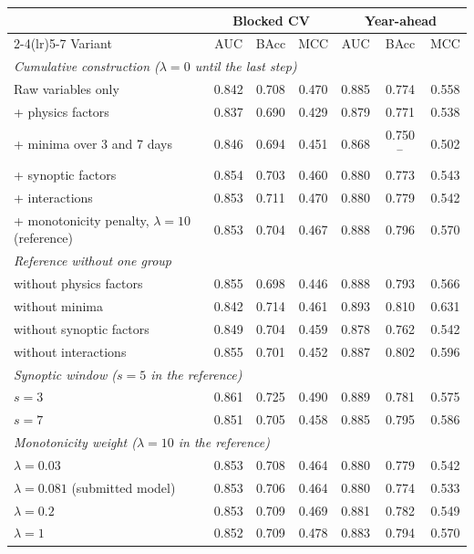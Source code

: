 \begin{tabular}{lcccccc}
\toprule
 & \multicolumn{3}{c}{Blocked CV} & \multicolumn{3}{c}{Year-ahead} \\
\cmidrule(lr){2-4}\cmidrule(lr){5-7}
Variant & AUC & BAcc & MCC & AUC & BAcc & MCC \\
\midrule
\multicolumn{7}{l}{\textit{Cumulative construction ($\lambda = 0$ until the last step)}} \\
\quad Raw variables only & 0.842 & 0.708 & 0.470 & 0.885 & 0.774 & 0.558 \\
\quad + physics factors & 0.837 & 0.690 & 0.429 & 0.879 & 0.771 & 0.538 \\
\quad + minima over 3 and 7 days & 0.846 & 0.694 & 0.451 & 0.868 & 0.750$^{-}$ & 0.502 \\
\quad + synoptic factors & 0.854 & 0.703 & 0.460 & 0.880 & 0.773 & 0.543 \\
\quad + interactions & 0.853 & 0.711 & 0.470 & 0.880 & 0.779 & 0.542 \\
\quad + monotonicity penalty, $\lambda = 10$ (reference) & 0.853 & 0.704 & 0.467 & 0.888 & 0.796 & 0.570 \\
\multicolumn{7}{l}{\textit{Reference without one group}} \\
\quad without physics factors & 0.855 & 0.698 & 0.446 & 0.888 & 0.793 & 0.566 \\
\quad without minima & 0.842 & 0.714 & 0.461 & 0.893 & 0.810 & 0.631 \\
\quad without synoptic factors & 0.849 & 0.704 & 0.459 & 0.878 & 0.762 & 0.542 \\
\quad without interactions & 0.855 & 0.701 & 0.452 & 0.887 & 0.802 & 0.596 \\
\multicolumn{7}{l}{\textit{Synoptic window ($s = 5$ in the reference)}} \\
\quad $s = 3$ & 0.861 & 0.725 & 0.490 & 0.889 & 0.781 & 0.575 \\
\quad $s = 7$ & 0.851 & 0.705 & 0.458 & 0.885 & 0.795 & 0.586 \\
\multicolumn{7}{l}{\textit{Monotonicity weight ($\lambda = 10$ in the reference)}} \\
\quad $\lambda = 0.03$ & 0.853 & 0.708 & 0.464 & 0.880 & 0.779 & 0.542 \\
\quad $\lambda = 0.081$ (submitted model) & 0.853 & 0.706 & 0.464 & 0.880 & 0.774 & 0.533 \\
\quad $\lambda = 0.2$ & 0.853 & 0.709 & 0.469 & 0.881 & 0.782 & 0.549 \\
\quad $\lambda = 1$ & 0.852 & 0.709 & 0.478 & 0.883 & 0.794 & 0.570 \\

\end{tabular}
